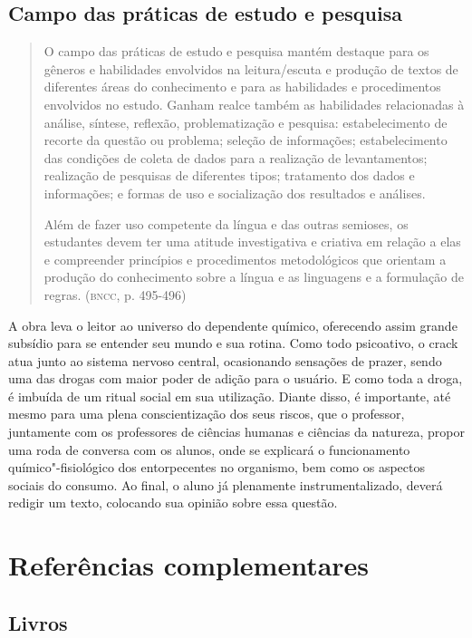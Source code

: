 \documentclass[11pt]{extarticle}
\begin{document}
\subsection{Campo das práticas de estudo e pesquisa}

\begin{quote}
O campo das práticas de estudo e pesquisa mantém destaque para os
gêneros e habilidades envolvidos na leitura/escuta e produção de textos
de diferentes áreas do conhecimento e para as habilidades e
procedimentos envolvidos no estudo. Ganham realce também as habilidades
relacionadas à análise, síntese, reflexão, problematização e pesquisa:
estabelecimento de recorte da questão ou problema; seleção de
informações; estabelecimento das condições de coleta de dados para a
realização de levantamentos; realização de pesquisas de diferentes
tipos; tratamento dos dados e informações; e formas de uso e
socialização dos resultados e análises.

Além de fazer uso competente da língua e das outras semioses, os
estudantes devem ter uma atitude investigativa e criativa em relação a
elas e compreender princípios e procedimentos metodológicos que orientam
a produção do conhecimento sobre a língua e as linguagens e a formulação
de regras. (\textsc{bncc}, p. 495-496)
\end{quote}

A obra leva o leitor ao universo do dependente químico, oferecendo
assim grande subsídio para se entender seu mundo e sua rotina. Como
todo psicoativo, o crack atua junto ao sistema nervoso central,
ocasionando sensações de prazer, sendo uma das drogas com maior poder
de adição para o usuário. E como toda a droga, é imbuída de um ritual
social em sua utilização. Diante disso, é importante, até mesmo para
uma plena conscientização dos seus riscos, que o professor, juntamente
com os professores de ciências humanas e ciências da natureza, propor
uma roda de conversa com os alunos, onde se explicará o funcionamento
químico"-fisiológico dos entorpecentes no organismo, bem como os
aspectos sociais do consumo. Ao final, o aluno já plenamente
instrumentalizado, deverá redigir um texto, colocando sua opinião
sobre essa questão.

\section{Referências complementares}

\subsection{Livros}
\end{document}
